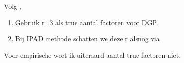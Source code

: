 \documentclass[12pt, a4paper]{article}
\begin{document}
 Volg \citet{fan2020ipad}, 
 \begin{enumerate}
     \item Gebruik r=3 als true aantal factoren voor DGP.
     \item Bij IPAD methode schatten we deze r alsnog via \citet{ahn2013} 
 \end{enumerate}

 Voor empirische weet ik uiteraard aantal true factoren niet.
   








 

\newpage

\begingroup
\small

\end{document}
